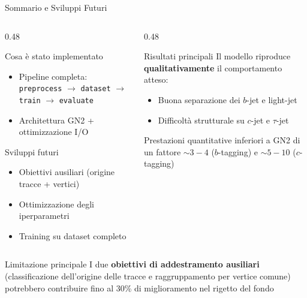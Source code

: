 \documentclass[aspectratio=169, 10pt]{beamer}
\begin{document}
\begin{frame}{Sommario e Sviluppi Futuri}
    \begin{columns}[T]
        \begin{column}{0.48\textwidth}
            \begin{block}{Cosa è stato implementato}
                \begin{itemize}
                    \item[$\checkmark$] Pipeline completa: \texttt{preprocess} $\to$ \texttt{dataset} $\to$ \texttt{train} $\to$ \texttt{evaluate}
                    \item[$\checkmark$] Architettura GN2 + ottimizzazione I/O
                \end{itemize}
            \end{block}
            \begin{block}{Sviluppi futuri}
                \begin{itemize}
                    \item Obiettivi ausiliari (origine tracce + vertici)
                    \item Ottimizzazione degli iperparametri
                    \item Training su dataset completo
                \end{itemize}
            \end{block}
        \end{column}
        \begin{column}{0.48\textwidth}
            \begin{block}{Risultati principali}
                Il modello riproduce \textbf{qualitativamente} il comportamento atteso:
                \begin{itemize}
                    \item Buona separazione dei $b$-jet e light-jet
                    \item Difficoltà strutturale su $c$-jet e $\tau$-jet
                \end{itemize}
                Prestazioni quantitative inferiori a GN2 di un fattore $\sim 3-4$ ($b$-tagging) e $\sim 5-10$ ($c$-tagging)
            \end{block}
        \end{column}
    \end{columns}
    \vspace{4pt}
    \begin{alertblock}{Limitazione principale}
        I due \textbf{obiettivi di addestramento ausiliari} (classificazione dell'origine delle tracce e raggruppamento per vertice comune) potrebbero contribuire fino al 30\% di miglioramento nel rigetto del fondo
    \end{alertblock}
\end{frame}
\end{document}
